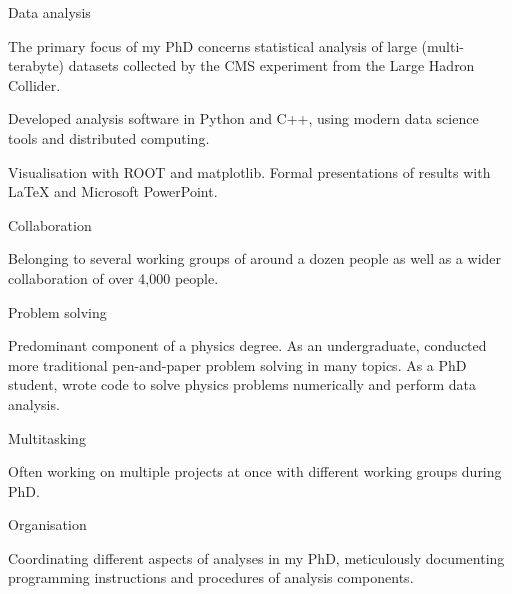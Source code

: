 \begin{cventries}

    \cventry
    {} %
    {Data analysis} %
    {} %
    {} %
    {
      \begin{cvitems}
        \item {The primary focus of my PhD concerns statistical analysis of large (multi-terabyte) datasets collected by the CMS experiment from the Large Hadron Collider.}
        \item {Developed analysis software in Python and C++, using modern data science tools and distributed computing.}
        \item{Visualisation with ROOT and matplotlib. Formal presentations of results with LaTeX and Microsoft PowerPoint.}
        \vpadding
        \end{cvitems}
    }

    \cventry
    {} %
    {Collaboration} %
    {} %
    {} %
    {
      \begin{cvitems}
        \item {Belonging to several working groups of around a dozen people as well as a wider collaboration of over 4,000 people.}
        \vpadding
        \end{cvitems}
    }

    \cventry
    {} %
    {Problem solving} %
    {} %
    {} %
    {
      \begin{cvitems}
        \item {Predominant component of a physics degree. As an undergraduate, conducted more traditional pen-and-paper problem solving in many topics. As a PhD student, wrote code to solve physics problems numerically and perform data analysis.}
        \vpadding
        \end{cvitems}
    }

    \cventry
    {} %
    {Multitasking} %
    {} %
    {} %
    {
      \begin{cvitems}
        \item {Often working on multiple projects at once with different working groups during PhD.}
        \vpadding
        \end{cvitems}
    }

    \cventry
    {} %
    {Organisation} %
    {} %
    {} %
    {
      \begin{cvitems}
        \item {Coordinating different aspects of analyses in my PhD, meticulously documenting programming instructions and procedures of analysis components.}
        \vpadding
        \end{cvitems}
        }


\end{cventries}
